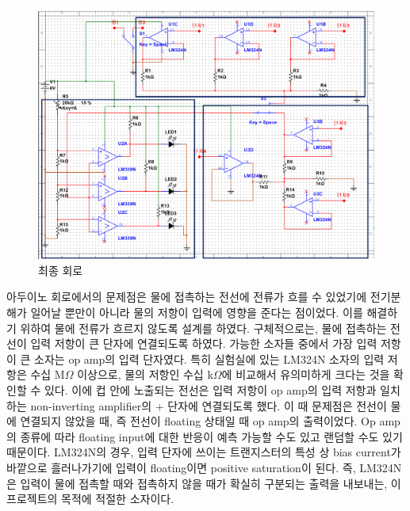 \documentclass[a4paper,itemph]{oblivoir}
\theoremstyle{definition}
\begin{document}
\begin{figure}[!htb]
  \includegraphics[width=\linewidth]{3rd.png}
  \caption{최종 회로}\label{fig:awesome_image3}
\endminipage
\end{figure}
아두이노 회로에서의 문제점은 물에 접촉하는 전선에 전류가 흐를 수 있었기에 전기분해가 일어날 뿐만이 아니라 물의 저항이 입력에 영향을 준다는 점이었다. 이를 해결하기 위하여 물에 전류가 흐르지 않도록 설계를 하였다. 구체적으로는, 물에 접촉하는 전선이 입력 저항이 큰 단자에 연결되도록 하였다. 가능한 소자들 중에서 가장 입력 저항이 큰 소자는 op amp의 입력 단자였다. 특히 실험실에 있는 LM324N 소자의 입력 저항은 수십 M$\Omega$ 이상으로, 물의 저항인 수십 k$\Omega$에 비교해서 유의미하게 크다는 것을 확인할 수 있다. 이에 컵 안에 노출되는 전선은 입력 저항이 op amp의 입력 저항과 일치하는 non-inverting amplifier의 + 단자에 연결되도록 했다. 이 때 문제점은 전선이 물에 연결되지 않았을 때, 즉 전선이 floating 상태일 때 op amp의 출력이었다. Op amp의 종류에 따라 floating input에 대한 반응이 예측 가능할 수도 있고 랜덤할 수도 있기 때문이다. LM324N의 경우, 입력 단자에 쓰이는 트랜지스터의 특성 상 bias current가 바깥으로 흘러나가기에 입력이 floating이면 positive saturation이 된다. 즉, LM324N은 입력이 물에 접촉할 때와 접촉하지 않을 때가 확실히 구분되는 출력을 내보내는, 이 프로젝트의 목적에 적절한 소자이다.
\end{document}
